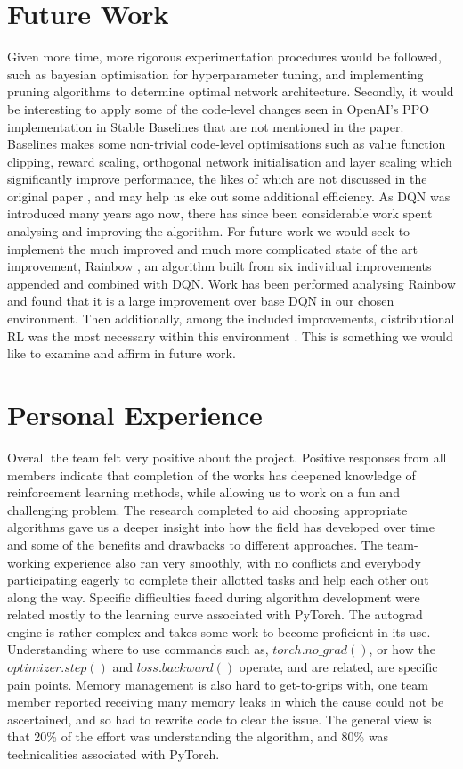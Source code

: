 \documentclass{article}
\begin{document}
\section{Future Work}
Given more time, more rigorous experimentation procedures would be followed, such as bayesian optimisation for hyperparameter tuning, and implementing pruning algorithms to determine optimal network architecture. Secondly, it would be interesting to apply some of the code-level changes seen in OpenAI's PPO implementation in Stable Baselines that are not mentioned in the paper. Baselines makes some non-trivial code-level optimisations such as value function clipping, reward scaling, orthogonal network initialisation and layer scaling which significantly improve performance, the likes of which are not discussed in the original paper \citep{engstrom2019implementation}, and may help us eke out some additional efficiency.
As DQN was introduced many years ago now, there has since been considerable work spent analysing and improving the algorithm. For future work we would seek to implement the much improved and much more complicated state of the art improvement, Rainbow \citep{rainbow}, an algorithm built from six individual improvements appended and combined with DQN. Work has been performed analysing Rainbow and found that it is a large improvement over base DQN in our chosen environment. Then additionally, among the included improvements, distributional RL \citep{distributionalrl} was the most necessary within this environment \cite{revisitingrainbow}. This is something we would like to examine and affirm in future work. 

\section{Personal Experience}
Overall the team felt very positive about the project. Positive responses from all members indicate that completion of the works has deepened knowledge of reinforcement learning methods, while allowing us to work on a fun and challenging problem. The research completed to aid choosing appropriate algorithms gave us a deeper insight into how the field has developed over time and some of the benefits and drawbacks to different approaches. The team-working experience also ran very smoothly, with no conflicts and everybody participating eagerly to complete their allotted tasks and help each other out along the way. Specific difficulties faced during algorithm development were related mostly to the learning curve associated with PyTorch. The autograd engine is rather complex and takes some work to become proficient in its use. Understanding where to use commands such as, \emph{$torch.no\_grad()$}, or how the \emph{$optimizer.step()$} and \emph{$loss.backward()$} operate, and are related, are specific pain points. Memory management is also hard to get-to-grips with, one team member reported receiving many memory leaks in which the cause could not be ascertained, and so had to rewrite code to clear the issue. The general view is that 20\% of the effort was understanding the algorithm, and 80\% was technicalities associated with PyTorch.
\end{document}
